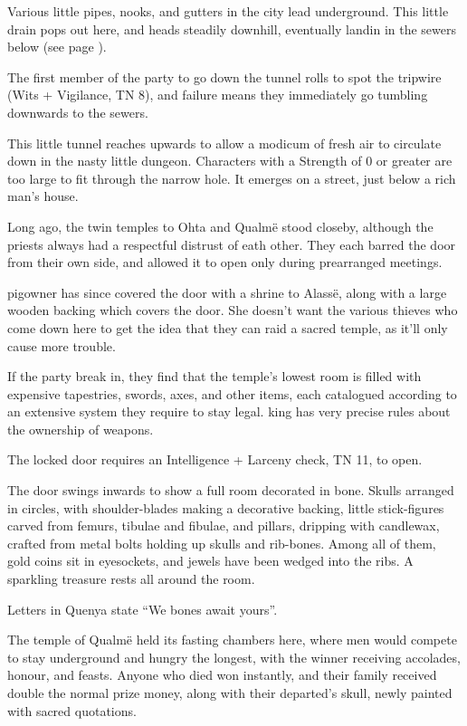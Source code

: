 \begin{multicols}{2}
Various little pipes, nooks, and gutters in the city lead underground.  This little drain pops out here, and heads steadily downhill, eventually landin in the sewers below (see page \pageref{slidein}).

The first member of the party to go down the tunnel rolls to spot the tripwire (Wits + Vigilance, TN 8), and failure means they immediately go tumbling downwards to the sewers.

This little tunnel reaches upwards to allow a modicum of fresh air to circulate down in the nasty little dungeon.  Characters with a Strength of 0 or greater are too large to fit through the narrow hole.  It emerges on a street, just below a rich man's house.

Long ago, the twin temples to Ohta and Qualm\"{e} stood closeby, although the priests always had a respectful distrust of eath other.  They each barred the door from their own side, and allowed it to open only during prearranged meetings.

\Gls{pigowner} has since covered the door with a shrine to Alass\"{e}, along with a large wooden backing which covers the door.  She doesn't want the various thieves who come down here to get the idea that they can raid a sacred temple, as it'll only cause more trouble.

If the party break in, they find that the temple's lowest room is filled with expensive tapestries, swords, axes, and other items, each catalogued according to an extensive system they require to stay legal.  \Gls{king} has very precise rules about the ownership of weapons.

The locked door requires an Intelligence + Larceny check, TN 11, to open.

\begin{boxtext}
	The door swings inwards to show a full room decorated in bone.  Skulls arranged in circles, with shoulder-blades making a decorative backing, little stick-figures carved from femurs, tibulae and fibulae, and pillars, dripping with candlewax, crafted from metal bolts holding up skulls and rib-bones.  Among all of them, gold coins sit in eyesockets, and jewels have been wedged into the ribs.  A sparkling treasure rests all around the room.

	Letters in Quenya state ``We bones await yours''.
\end{boxtext}

The temple of Qualm\"{e} held its fasting chambers here, where men would compete to stay underground and hungry the longest, with the winner receiving accolades, honour, and feasts.  Anyone who died won instantly, and their family received double the normal prize money, along with their departed's skull, newly painted with sacred quotations.


\end{multicols}
